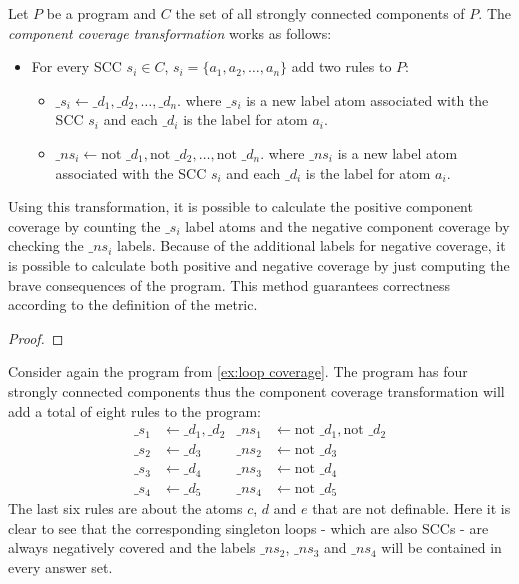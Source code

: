 \begin{definition}
\label{def:component transformation}
    Let $P$ be a program and $C$ the set of all strongly connected components of $P$. The \emph{component coverage transformation} works as follows:
    \begin{itemize}
        \item For every SCC \(s_i \in C\), \(s_i = \{a_1, a_2, \ldots, a_n\}\) add two rules to $P$:
        \begin{itemize}
            \item \(\_s_i \leftarrow \_d_1, \_d_2, \ldots, \_d_n.\) where $\_s_i$ is a new label atom associated with the SCC $s_i$ and each $\_d_i$ is the label for atom $a_i$.
            \item \(\_ns_i \leftarrow \text{not } \_d_1, \text{not } \_d_2, \ldots, \text{not } \_d_n.\) where $\_ns_i$ is a new label atom associated with the SCC $s_i$ and each $\_d_i$ is the label for atom $a_i$.
        \end{itemize}
    \end{itemize}
\end{definition}

Using this transformation, it is possible to calculate the positive component coverage by counting the $\_s_i$ label atoms and the negative component coverage by checking the $\_ns_i$ labels. Because of the additional labels for negative coverage, it is possible to calculate both positive and negative coverage by just computing the brave consequences of the program. This method guarantees correctness according to the definition of the metric.

\begin{proof}
    
\end{proof}

\begin{example}
\label{ex:component transformation}
    Consider again the program from \cref{ex:loop coverage}. The program has four strongly connected components thus the component coverage transformation will add a total of eight rules to the program:
    \begin{align*}
        \_s_1 &\leftarrow \_d_1, \_d_2  &  \_ns_1 &\leftarrow \text{not } \_d_1, \text{not } \_d_2 \\
        \_s_2 &\leftarrow \_d_3  &  \_ns_2 &\leftarrow \text{not } \_d_3 \\
        \_s_3 &\leftarrow \_d_4  &  \_ns_3 &\leftarrow \text{not } \_d_4 \\
        \_s_4 &\leftarrow \_d_5  &  \_ns_4 &\leftarrow \text{not } \_d_5 
    \end{align*}
    The last six rules are about the atoms $c$, $d$ and $e$ that are not definable. Here it is clear to see that the corresponding singleton loops - which are also SCCs - are always negatively covered and the labels $\_ns_2$, $\_ns_3$ and $\_ns_4$ will be contained in every answer set.
\end{example}

